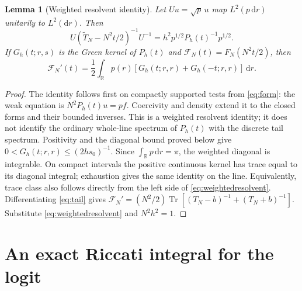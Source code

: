 \documentclass[10pt]{article}
\newtheorem{lemma}[theorem]{Lemma}
\newcommand{\dd}{\mathrm d}
\newcommand{\Tr}{\operatorname{Tr}}
\newcommand{\RR}{\mathbb R}
\begin{document}
\begin{lemma}[Weighted resolvent identity]\label{lem:resolvent}
Let $Uu=\sqrt p\,u$ map $L^2(p\,\dd r)$ unitarily to $L^2(\dd r)$.
Then
\begin{equation}
U(\widetilde T_N-N^2t/2)^{-1}U^{-1}
=h^2p^{1/2}P_h(t)^{-1}p^{1/2}.
\label{eq:weightedresolvent}
\end{equation}
If $G_h(t;r,s)$ is the Green kernel of $P_h(t)$ and
$\mathcal F_N(t)=F_N(N^2t/2)$, then
\begin{equation}
\mathcal F_N'(t)=\frac12\int_{\RR}p(r)
 [G_h(t;r,r)+G_h(-t;r,r)]\,\dd r.
\label{eq:Fprime}
\end{equation}
\end{lemma}
\begin{proof}
The identity follows first on compactly supported tests from
\eqref{eq:form}: the weak equation is $N^2P_h(t)u=p f$.
Coercivity and density extend it to the closed forms and their
bounded inverses. This is a weighted resolvent identity; it does
not identify the ordinary whole-line spectrum of $P_h(t)$ with
the discrete tail spectrum.
Positivity and the diagonal bound proved below give
$0<G_h(t;r,r)\le(2hs_0)^{-1}$. Since $\int_{\RR}p\,\dd r=\pi$,
the weighted diagonal is integrable. On compact intervals the
positive continuous kernel has trace equal to its diagonal integral;
exhaustion gives the same identity on the line. Equivalently,
trace class also follows directly from the left side of
\eqref{eq:weightedresolvent}. Differentiating \eqref{eq:tail} gives
$\mathcal F_N'=(N^2/2)\Tr[(T_N-b)^{-1}+(T_N+b)^{-1}]$.
Substitute \eqref{eq:weightedresolvent} and $N^2h^2=1$.
\end{proof}

\section{An exact Riccati integral for the logit}
\end{document}
